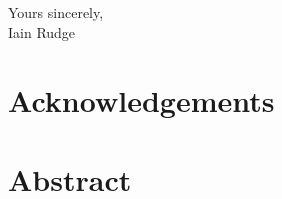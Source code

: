 \documentclass[12pt, openany, a4paper]{book}
\renewcommand{\baselinestretch}{1.5}
\begin{document}
\begin{flushright}
	Yours sincerely,\\
	\medskip
	\medskip
	\medskip
Iain Rudge
\end{flushright}

\cleardoublepage




\chapter{Acknowledgements}




\cleardoublepage

\chapter{Abstract}



\singlespacing
\tableofcontents
\renewcommand{\baselinestretch}{1.5}

\listoffigures
{}

\listoftables
{}
\renewcommand{\baselinestretch}{1.5}
\onehalfspacing
% 

\cleardoublepage

\mainmatter
\end{document}
